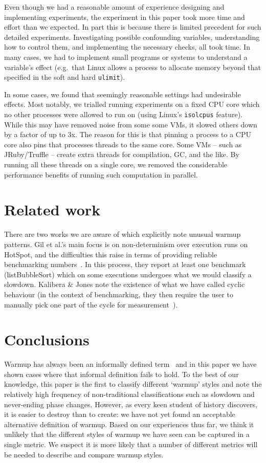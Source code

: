 \documentclass[a4paper,UKenglish]{lipics}
\newcommand{\kalibera}{Kalibera \& Jones\xspace}
\begin{document}
Even though we had a reasonable amount of experience designing and implementing
experiments, the experiment in this paper took more time and effort than we
expected. In part this is because there is limited precedent for such detailed
experiments. Investigating possible confounding variables, understanding how to
control them, and implementing the necessary checks, all took time. In many
cases, we had to implement small programs or systems to understand a variable's
effect (e.g.~that Linux allows a process to allocate memory beyond that
specified in the soft and hard \texttt{ulimit}).

In some cases, we found that seemingly reasonable settings had undesirable
effects. Most notably, we trialled running experiments on a fixed CPU core which
no other processes were allowed to run on (using Linux's \texttt{isolcpus}
feature). While this may have removed noise from some some VMs,
it slowed others down by
a factor of up to 3x. The reason for this is that pinning a process to a CPU
core also pins that processes threads to the same core. Some VMs -- such as
JRuby/Truffle -- create extra threads for compilation, GC, and the like. By
running all these threads on a single core, we removed the considerable
performance benefits of running such computation in parallel.


\section{Related work}

There are two works we are aware of which explicitly note unusual warmup
patterns. Gil et al.'s main focus is on non-determinism over execution runs on
HotSpot, and the difficulties this raise in terms of providing reliable
benchmarking numbers~\cite{gil11microbenchmark}. In this process, they report at
least one benchmark (listBubbleSort) which on some executions undergoes what we
would classify a slowdown. \kalibera note the
existence of what we have called cyclic behaviour (in the context of benchmarking,
they then require the user to
manually pick one part of the cycle for measurement~\cite{kalibera13rigorous}).


\section{Conclusions}
\label{sec:conclusion}

Warmup has always been an informally defined term~\cite{seaton15phd} and in this
paper we have shown cases where that informal definition fails to hold.
To the best of our knowledge, this paper is the first to classify different
`warmup' styles and note the relatively high frequency of non-traditional
classifications such as slowdown and never-ending phase changes.
However, as every keen student of history discovers, it is easier to destroy than to
create: we have not yet found an acceptable alternative definition of warmup.
Based on our experiences thus far, we think it unlikely that the different
styles of warmup we have seen can be captured in a single metric. We suspect it
is more likely that a number of different metrics will be needed to describe and
compare warmup styles.



\end{document}

